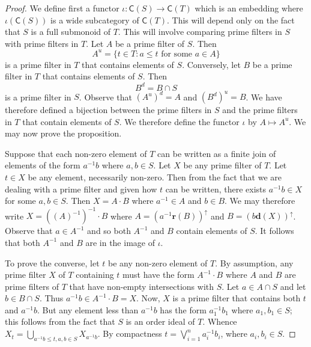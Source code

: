 \documentclass[10pt,a4paper]{amsart}
\begin{document}
\begin{proof} We define first a functor $\iota \colon \mathsf{C}(S) \rightarrow \mathsf{C}(T)$
which is an embedding where $\iota (\mathsf{C}(S))$ is a wide subcategory of $\mathsf{C}(T)$.
This will depend only on the fact that $S$ is a full submonoid of $T$.
This will involve comparing prime filters in $S$ with prime filters in $T$.
Let $A$ be a prime filter of $S$.
Then 
$$A^{u} = \{t \in T \colon a \leq t \text{ for some } a \in A\}$$ 
is a prime filter in $T$ that contains elements of $S$.
Conversely, let $B$ be a prime filter in $T$ that contains elements of $S$.
Then 
$$B^{d} = B \cap S$$
is a prime filter in $S$.
Observe that $(A^{u})^{d} = A$ and $(B^{d})^{u} = B$.
We have therefore defined a bijection between the prime filters in $S$ and the prime filters in $T$ that contain elements of $S$.
We therefore define the functor $\iota$ by $A \mapsto A^{u}$.
We may now prove the proposition.

Suppose that each non-zero element of $T$ can be written as a finite join of elements of the form $a^{-1}b$ where $a,b \in S$.
Let $X$ be any prime filter of $T$.
Let $t \in X$ be any element, necessarily non-zero.
Then from the fact that we are dealing with a prime filter and given how $t$ can be written, there exists $a^{-1}b \in X$ for some $a,b \in S$.
Then $X = A \cdot B$ where $a^{-1} \in A$ and $b \in B$.
We may therefore  write $X = ((A)^{-1})^{-1} \cdot B$
where
$A = (a^{-1}\mathbf{r}(B))^{\uparrow}$
and
$B =(b \mathbf{d}(X))^{\uparrow}$.
Observe that $a \in A^{-1}$
and so both $A^{-1}$ and $B$ contain elements of $S$.
It follows that both $A^{-1}$ and $B$ are in the image of $\iota$.

To prove the converse,
let $t$ be any non-zero element of $T$.
By assumption, any prime filter $X$ of $T$ containing $t$ must have the form $A^{-1} \cdot B$ where $A$ and $B$ are 
prime filters of $T$ that have non-empty intersections with $S$.
Let $a \in A \cap S$ and let $b \in B \cap S$.
Thus $a^{-1}b \in A^{-1}  \cdot B = X$.
Now,  $X$ is a prime filter that contains both $t$ and $a^{-1}b$.
But any element less than $a^{-1}b$ has the form $a_{1}^{-1}b_{1}$ where $a_{1}, b_{1} \in S$;
this follows from the fact that $S$ is an order ideal of $T$.
Whence $X_{t} = \bigcup_{a^{-1}b \leq t, a,b \in S} X_{a^{-1}b}$.
By compactness $t = \bigvee_{i=1}^{n}a_{i}^{-1}b_{i}$, where $a_{i},b_{i} \in S$.
\end{proof}
\end{document}
